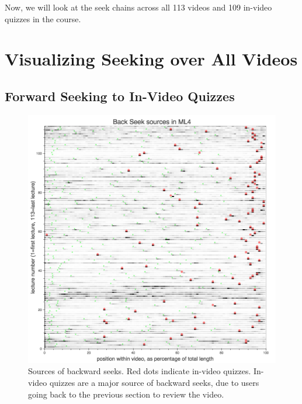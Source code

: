 \documentclass{sigchi}
\begin{document}

Now, we will look at the seek chains across all 113 videos and 109 in-video quizzes in the course.


\section{Visualizing Seeking over All Videos}

\subsection{Forward Seeking to In-Video Quizzes}

\begin{figure}
\includegraphics[width=1.0\columnwidth]{back-seek-sources-allvideos}
\caption{Sources of backward seeks. Red dots indicate in-video quizzes. In-video quizzes are a major source of backward seeks, due to users going back to the previous section to review the video.}
\label{fig:back-seek-sources-allvideos}
\end{figure}
\end{document}
